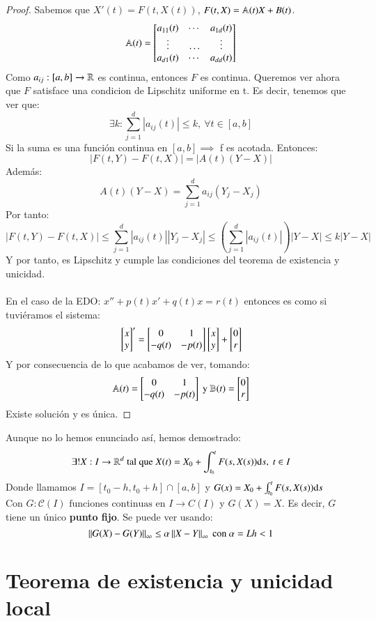 \begin{proof}
    Sabemos que $X'(t) = F(t, X(t))$, $F(t, X) = \mathbb{A}(t) X +  B(t)$.
    $$
        \A(t) = \mx{a_{11}(t) & \cdots & a_{1d}(t)\\
            \vdots &    \ldots & \vdots \\
            a_{d1}(t) & \cdots & a_{dd}(t)}
    $$
    Como $a_{ij} : [a,b] \to \mathbb{R}$ es continua, entonces $F$ es continua. Queremos ver ahora que $F$ satisface una condicion de Lipschitz uniforme en t. Es decir, tenemos que ver que:
    $$
        \exists k : \sum_{j=1}^d |a_{ij}(t)| \leq k ,\ \forall t \in [a, b]
    $$
    Si la suma es una función continua en $[a, b] \implies$ f es acotada. Entonces:
    $$
        |F(t, Y) - F(t, X)| = |A(t) (Y - X)|
    $$
    Además:
    $$
        A(t)(Y-X) = \sum_{j=1}^d a_{ij}(Y_j - X_j)
    $$
    Por tanto:
    $$
     |F(t, Y) - F(t, X)| \leq \sum_{j=1}^d |a_{ij}(t)||Y_j-X_j| \leq \left(\sum_{j=1}^d |a_{ij}(t)|\right) |Y-X| \leq k |Y - X|
    $$
    Y por tanto, es Lipschitz y cumple las condiciones del teorema de existencia y unicidad.\\\\
    En el caso de la EDO: $x'' + p(t) x' + q(t) x = r(t)$ entonces es como si tuviéramos el sistema:
    $$
        \mx{x\\y}' = \mx{0 & 1 \\ -q(t) & -p(t)} \mx{x\\y} + \mx{0\\r}
    $$
    Y por consecuencia de lo que acabamos de ver, tomando:
    $$
        \A(t) = \mx{0 & 1 \\ -q(t) & -p(t)} \text{ y } \B(t) = \mx{0\\r}
    $$
    Existe solución y es única.
\end{proof}

\begin{obs}
    Aunque no lo hemos enunciado así, hemos demostrado:
    $$
        \exists ! X : I \to \mathbb{R}^d \text{ tal que } X(t) = X_0 + \int_{t_0}^t F(s, X(s)) \mathrm{d} s,\ t \in I
    $$
    Donde llamamos $I = [t_0 - h, t_0 + h] \cap [a, b]$ y $G(x) = X_0 + \int_{t_0}^t F(s, X(s)) \mathrm{d} s$\\
    Con $G : \mathcal{C}(I) \text{ funciones continuas en } I \to C(I)$ y $G(X) = X$. Es decir, $G$ tiene un único \textbf{punto fijo}. Se puede ver usando:
    $$
        \left|\left|G(X) - G(Y)\right|\right|_\infty \leq \alpha \left|\left|X - Y\right|\right|_\infty \text{ con } \alpha = Lh < 1
    $$
\end{obs}

\section{Teorema de existencia y unicidad local}

